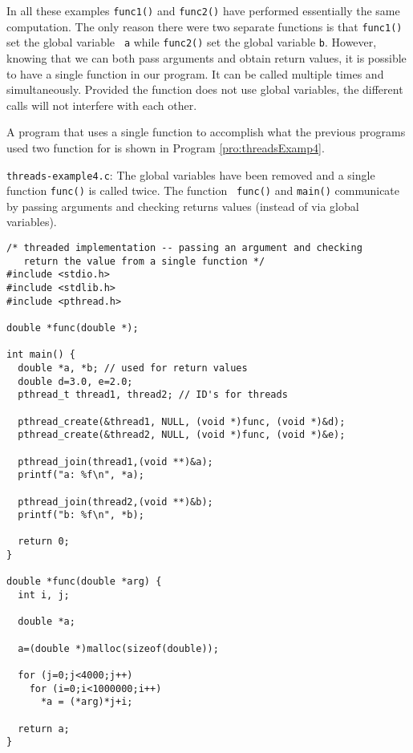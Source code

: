 In all these examples {\tt func1()} and {\tt func2()} have performed
essentially the same computation.  The only reason there were two
separate functions is that {\tt func1()} set the global variable {\tt
a} while {\tt func2()} set the global variable {\tt b}.  However,
knowing that we can both pass arguments and obtain return values, it
is possible to have a single function in our program.  It can be
called multiple times and simultaneously.  Provided the function does
not use global variables, the different calls will not interfere with
each other.  

A program that uses a single function to accomplish what the previous
programs used two function for is shown in Program
\ref{pro:threadsExamp4}.  

\begin{program}
{\tt threads-example4.c}: The global variables have been removed and a
single function {\tt func()} is called twice.  The function {\tt
func()} and {\tt main()} communicate by passing arguments and checking
returns values (instead of via global variables).
\label{pro:threadsExamp4}
\codemiddle
\begin{lstlisting}
/* threaded implementation -- passing an argument and checking
   return the value from a single function */
#include <stdio.h>
#include <stdlib.h>
#include <pthread.h>

double *func(double *);

int main() {
  double *a, *b; // used for return values
  double d=3.0, e=2.0;
  pthread_t thread1, thread2; // ID's for threads

  pthread_create(&thread1, NULL, (void *)func, (void *)&d);
  pthread_create(&thread2, NULL, (void *)func, (void *)&e);

  pthread_join(thread1,(void **)&a);
  printf("a: %f\n", *a);

  pthread_join(thread2,(void **)&b);
  printf("b: %f\n", *b);

  return 0;
}

double *func(double *arg) {
  int i, j;

  double *a;

  a=(double *)malloc(sizeof(double));

  for (j=0;j<4000;j++)
    for (i=0;i<1000000;i++)
      *a = (*arg)*j+i;

  return a;
}
\end{lstlisting}
\end{program}

